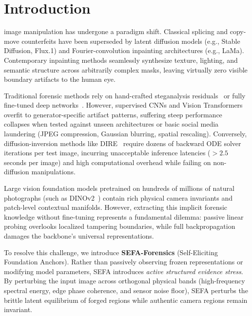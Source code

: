 \documentclass[10pt,journal,compsoc]{IEEEtran}
\begin{document}
\maketitle
\IEEEdisplaynontitleabstractindextext
\IEEEpeerreviewmaketitle

\section{Introduction}
 image manipulation has undergone a paradigm shift. Classical splicing and copy-move counterfeits have been superseded by latent diffusion models (e.g., Stable Diffusion, Flux.1) and Fourier-convolution inpainting architectures (e.g., LaMa). Contemporary inpainting methods seamlessly synthesize texture, lighting, and semantic structure across arbitrarily complex masks, leaving virtually zero visible boundary artifacts to the human eye.

Traditional forensic methods rely on hand-crafted steganalysis residuals~\cite{fridrich2012rich} or fully fine-tuned deep networks~\cite{wang2020cnn,guillaro2023trufor}. However, supervised CNNs and Vision Transformers overfit to generator-specific artifact patterns, suffering steep performance collapses when tested against unseen architectures or basic social media laundering (JPEG compression, Gaussian blurring, spatial rescaling). Conversely, diffusion-inversion methods like DIRE~\cite{wang2023dire} require dozens of backward ODE solver iterations per test image, incurring unacceptable inference latencies ($>2.5$ seconds per image) and high computational overhead while failing on non-diffusion manipulations.

Large vision foundation models pretrained on hundreds of millions of natural photographs (such as DINOv2~\cite{oquab2023dinov2}) contain rich physical camera invariants and patch-level contextual manifolds. However, extracting this implicit forensic knowledge without fine-tuning represents a fundamental dilemma: passive linear probing overlooks localized tampering boundaries, while full backpropagation damages the backbone's universal representations.

To resolve this challenge, we introduce \textbf{SEFA-Forensics} (Self-Eliciting Foundation Anchors). Rather than passively observing frozen representations or modifying model parameters, SEFA introduces \textit{active structured evidence stress}. By perturbing the input image across orthogonal physical bands (high-frequency spectral energy, edge phase coherence, and sensor noise floor), SEFA perturbs the brittle latent equilibrium of forged regions while authentic camera regions remain invariant.
\end{document}
